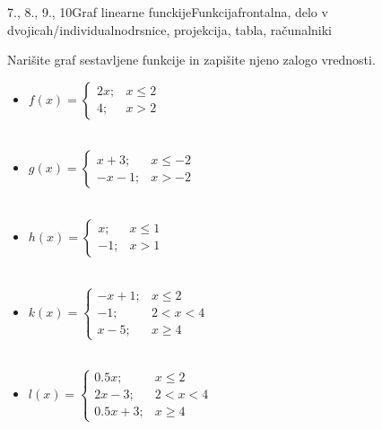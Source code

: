 \begin{priprava}{7., 8., 9., 10}{}{Graf linearne funckije}{Funkcija}{frontalna, delo v dvojicah/individualno}{drsnice, projekcija, tabla, računalniki}
            \begin{naloga}
                Narišite graf sestavljene funkcije in zapišite njeno zalogo vrednosti.
                    \begin{multicols}{2}
                    \begin{itemize}
                        \item $f(x)=\begin{cases}
                            2x; & x\leq 2 \\ 4; &x>2
                        \end{cases}$ \\~
                        \item $g(x)=\begin{cases}
                            x+3; & x\leq -2 \\ -x-1; &x>-2
                        \end{cases}$ \\~
                        \item $h(x)=\begin{cases}
                            x; & x\leq 1 \\ -1; & x>1
                        \end{cases}$ \\~
                        \item $k(x)=\begin{cases}
                            -x+1; & x\leq 2 \\ -1; &2<x<4 \\ x-5; &x\geq 4
                        \end{cases}$ \\~
                        \item $l(x)=\begin{cases}
                            0.5x; & x\leq 2 \\ 2x-3; &2<x<4 \\ 0.5x+3; &x\geq 4
                        \end{cases}$ \\~
                    \end{itemize}
                \end{multicols}
        \end{naloga}



\end{priprava}
